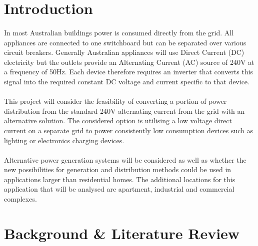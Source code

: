 
\section{Introduction}

\paragraph{} 
In most Australian buildings power is consumed directly from the grid. All appliances are connected to one switchboard but can be separated over various circuit breakers. Generally Australian appliances will use Direct Current (DC) electricity but the outlets provide an Alternating Current (AC) source of 240V at a frequency of 50Hz. Each device therefore requires an inverter that converts this signal into the required constant DC voltage and current specific to that device. 

\paragraph{} 
This project will consider the feasibility of converting a portion of power distribution from the standard 240V alternating current from the grid with an alternative solution. The considered option is utilising a low voltage direct current on a separate grid to power consistently low consumption devices such as lighting or electronics charging devices. 

\paragraph{} 
Alternative power generation systems will be considered as well as whether the new possibilities for generation and distribution methods could be used in applications larger than residential homes. The additional locations for this application that will be analysed are apartment, industrial and commercial complexes.

\newpage


\section{Background \& Literature Review}

